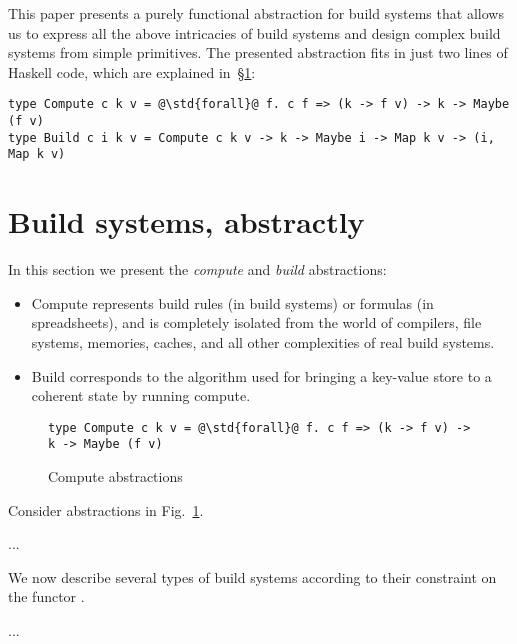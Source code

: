 \clearpage

This paper presents a purely functional abstraction for build systems that
allows us to express all the above intricacies of build systems and design
complex build systems from simple primitives. The presented abstraction fits in
just two lines of Haskell code, which are explained
in~\S\ref{sec-abstractions}:

\begin{verbatim}
type Compute c k v = @\std{forall}@ f. c f => (k -> f v) -> k -> Maybe (f v)
type Build c i k v = Compute c k v -> k -> Maybe i -> Map k v -> (i, Map k v)
\end{verbatim}


\section{Build systems, abstractly}\label{sec-abstractions}

In this section we present the \emph{compute} and \emph{build} abstractions:
\begin{itemize}
    \item Compute represents build rules (in build systems) or formulas (in
    spreadsheets), and is completely isolated from the world of compilers, file
    systems, memories, caches, and all other complexities of real build systems.
    \item Build corresponds to the algorithm used for bringing a key-value store
    to a coherent state by running compute.
\end{itemize}

\begin{figure}
\begin{verbatim}
type Compute c k v = @\std{forall}@ f. c f => (k -> f v) -> k -> Maybe (f v)
\end{verbatim}
\caption{Compute abstractions}\label{fig-compute}
\end{figure}

Consider abstractions in Fig.~\ref{fig-compute}.

...

We now describe several types of build systems according to their constraint
on the functor .

...

